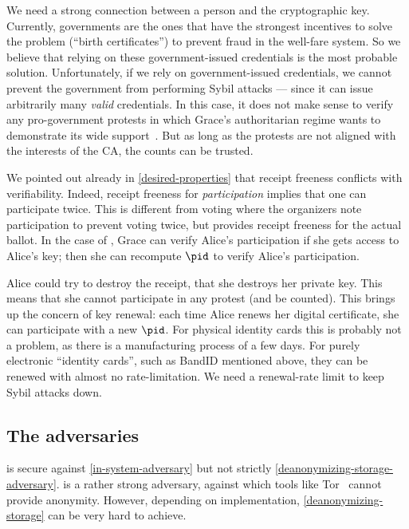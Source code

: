 We need a strong connection between a person and the cryptographic key.
Currently, governments are the ones that have the strongest incentives to solve 
the problem (\enquote{birth certificates}) to prevent \eg fraud in the 
well-fare system.
So we believe that relying on these government-issued credentials is the most 
probable solution.
Unfortunately, if we rely on government-issued credentials, we cannot prevent 
the government from performing Sybil attacks --- since it can issue arbitrarily 
many \emph{valid} credentials.
In this case, it does not make sense to verify any pro-government protests in 
which Grace's authoritarian regime wants to demonstrate its wide 
support~\cite{AlJazeeraOnVenezuela2017,VenezuelanStateWorkersCalledToParticipate}.
But as long as the protests are not aligned with the interests of the \ac{CA}, 
the counts can be trusted.

We pointed out already in \cref{desired-properties} that receipt freeness 
conflicts with verifiability.
Indeed, receipt freeness for \emph{participation} implies that one can 
participate twice.
This is different from voting where the organizers note participation to 
prevent voting twice, but provides receipt freeness for the actual ballot.
In the case of \CROCUS, Grace can verify Alice's participation if she gets 
access to Alice's key; then she can recompute \(\pid\) to verify Alice's 
participation.

Alice could try to destroy the receipt, \ie that she destroys her private key.
This means that she cannot participate in any protest (and be counted).
This brings up the concern of key renewal: each time Alice renews her digital 
certificate, she can participate with a new \(\pid\).
For physical identity cards this is probably not a problem, as there is a 
manufacturing process of a few days.
For purely electronic \enquote{identity cards}, such as BandID mentioned above, 
they can be renewed with almost no rate-limitation.
We need a renewal-rate limit to keep Sybil attacks down.

\subsection{The adversaries}

\CROCUS is secure against \cref{in-system-adversary} but not strictly 
\cref{deanonymizing-storage-adversary}.
 is a rather strong adversary,  against 
which tools like Tor~\cite{Tor} cannot provide anonymity.
However, depending on implementation, \cref{deanonymizing-storage} can be very 
hard to achieve.

